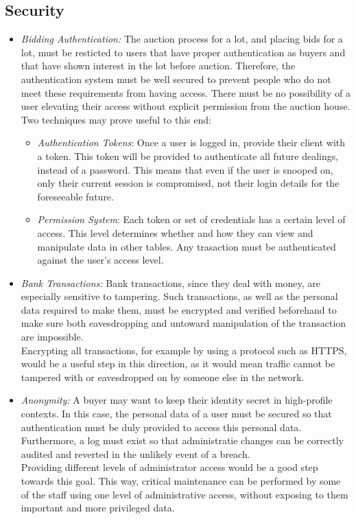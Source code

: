 \documentclass[titlepage, 12pt]{extarticle}
\begin{document}
\subsection{Security}
\begin{itemize}
\item {\it Bidding Authentication:} The auction process for a lot, and placing bids for a lot, must be resticted to users that have proper authentication as buyers and that have shown interest in the lot before auction. Therefore, the authentication system must be well secured to prevent people who do not meet these requirements from having access. There must be no possibility of a user elevating their access without explicit permission from the auction house. 
\\Two techniques may prove useful to this end:
    \begin{itemize}
    \item {\it Authentication Tokens}: Once a user is logged in, provide their client with a token. This token will be provided to authenticate all future dealings, instead of a password. This means that even if the user is snooped on, only their current session is compromised, not their login details for the foreseeable future.
    \item {\it Permission System}: Each token or set of credentials has a certain level of access. This level determines whether and how they can view and manipulate data in other tables. Any trasaction must be authenticated against the user's access level.
    \end{itemize}
\item {\it Bank Transactions:} Bank transactions, since they deal with money, are especially sensitive to tampering. Such transactions, as well as the personal data required to make them, must be encrypted and verified beforehand to make sure both eavesdropping and untoward manipulation of the transaction are impossible. 
\\Encrypting all transactions, for example by using a protocol such as HTTPS, would be a useful step in this direction, as it would mean traffic cannot be tampered with or eavesdropped on by someone else in the network.
\item {\it Anonymity:} A buyer may want to keep their identity secret in high-profile contexts. In this case, the personal data of a user must be secured so that authentication must be duly provided to access this personal data. Furthermore, a log must exist so that administratie changes can be correctly audited and reverted in the unlikely event of a breach.
\\Providing different levels of administrator access would be a good step towards this goal. This way, critical maintenance can be performed by some of the staff using one level of administrative access, without exposing to them important and more privileged data.
\end{itemize}
\end{document}
